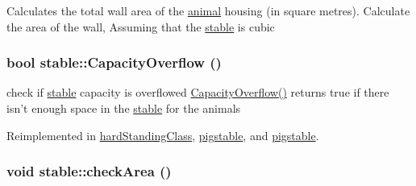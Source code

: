 Calculates the total wall area of the \hyperlink{classanimal}{animal} housing (in square metres). Calculate the area of the wall, Assuming that the \hyperlink{classstable}{stable} is cubic \hypertarget{classstable_a2014aabbb54c1309c936c527f3d385e8}{
\subsubsection[{CapacityOverflow}]{\setlength{\rightskip}{0pt plus 5cm}bool stable::CapacityOverflow ()}}
\label{classstable_a2014aabbb54c1309c936c527f3d385e8}


check if \hyperlink{classstable}{stable} capacity is overflowed \hyperlink{classstable_a2014aabbb54c1309c936c527f3d385e8}{CapacityOverflow()} returns true if there isn't enough space in the \hyperlink{classstable}{stable} for the animals 

Reimplemented in \hyperlink{classhard_standing_class_a458d101f2c4346d2e019d284f273181b}{hardStandingClass}, \hyperlink{classpigstable_ab741568ab92b4d23205c5c19c749b574}{pigstable}, and \hyperlink{classpigstable_a952f12bb06ab3080002183709010b0e9}{pigstable}.\hypertarget{classstable_abf86381ef397c270b3eeb9909dc06a23}{
\subsubsection[{checkArea}]{\setlength{\rightskip}{0pt plus 5cm}void stable::checkArea ()}}
\label{classstable_abf86381ef397c270b3eeb9909dc06a23}


